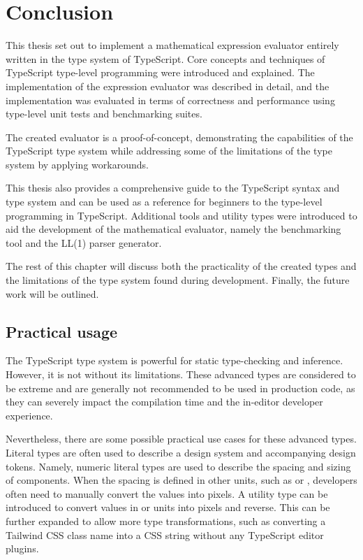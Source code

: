 \chapter{Conclusion}

This thesis set out to implement a mathematical expression evaluator entirely written in the type system of TypeScript. Core concepts and techniques of TypeScript type-level programming were introduced and explained. The implementation of the expression evaluator was described in detail, and the implementation was evaluated in terms of correctness and performance using type-level unit tests and benchmarking suites.

The created evaluator is a proof-of-concept, demonstrating the capabilities of the TypeScript type system while addressing some of the limitations of the type system by applying workarounds.

This thesis also provides a comprehensive guide to the TypeScript syntax and type system and can be used as a reference for beginners to the type-level programming in TypeScript. Additional tools and utility types were introduced to aid the development of the mathematical evaluator, namely the benchmarking tool and the LL(1) parser generator.

The rest of this chapter will discuss both the practicality of the created types and the limitations of the type system found during development. Finally, the future work will be outlined.

\section{Practical usage}

The TypeScript type system is powerful for static type-checking and inference. However, it is not without its limitations. These advanced types are considered to be extreme and are generally not recommended to be used in production code, as they can severely impact the compilation time and the in-editor developer experience.

Nevertheless, there are some possible practical use cases for these advanced types. Literal types are often used to describe a design system and accompanying design tokens. Namely, numeric literal types are used to describe the spacing and sizing of components. When the spacing is defined in other units, such as  or , developers often need to manually convert the values into pixels. A utility type can be introduced to convert values in  or  units into pixels and reverse. This can be further expanded to allow more type transformations, such as converting a Tailwind CSS class name into a CSS string without any TypeScript editor plugins.

